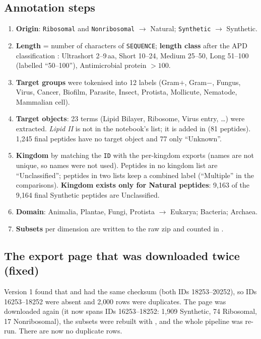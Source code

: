 \documentclass[11pt,a4paper]{article}
\newcommand{\amin}{\,aa}
\begin{document}
\subsection{Annotation steps}
\begin{enumerate}
\item \textbf{Origin}: \texttt{Ribosomal} and \texttt{Nonribosomal} $\rightarrow$ Natural; \texttt{Synthetic} $\rightarrow$ Synthetic.
\item \textbf{Length} = number of characters of \texttt{SEQUENCE}; \textbf{length class} after the APD classification \cite{wang2022}: Ultrashort 2--9\amin, Short 10--24, Medium 25--50,
      Long 51--100 (labelled ``50--100''), Antimicrobial protein $>100$.
\item \textbf{Target groups} were tokenised into 12 labels (Gram$+$, Gram$-$, Fungus, Virus, Cancer, Biofilm, Parasite, Insect, Protista, Mollicute, Nematode, Mammalian cell).
\item \textbf{Target objects}: 23 terms (Lipid Bilayer, Ribosome, Virus entry, \dots) were extracted. \emph{Lipid II} is not in the notebook's list; it is added in
       (81 peptides). 1{,}245 final peptides have no target object and 77 only ``Unknown''.
\item \textbf{Kingdom} by matching the \texttt{ID} with the per-kingdom exports (names are not unique, so names were not used). Peptides in no kingdom list are ``Unclassified'';
      peptides in two lists keep a combined label (``Multiple'' in the comparisons). \textbf{Kingdom exists only for Natural peptides}: 9{,}163 of the 9{,}164 final Synthetic peptides are Unclassified.
\item \textbf{Domain}: Animalia, Plantae, Fungi, Protista $\rightarrow$ Eukarya; Bacteria; Archaea.
\item \textbf{Subsets} per dimension are written to the raw zip and counted in .
\end{enumerate}

\subsection{The export page that was downloaded twice (fixed)}
Version 1 found that  and  had the same checksum (both IDs 18253--20252), so IDs 16253--18252 were absent and
2{,}000 rows were duplicates. The page was downloaded again (it now spans IDs 16253--18252: 1{,}909 Synthetic, 74 Ribosomal, 17 Nonribosomal), the subsets were rebuilt with
, and the whole pipeline was re-run. There are now no duplicate rows.
\end{document}
